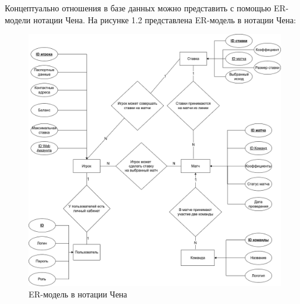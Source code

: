 Концептуально отношения в базе данных можно представить с помощью ER-модели нотации Чена.
На рисунке 1.2 представлена ER-модель в нотации Чена:
\FloatBarrier
\begin{figure}[hp]	
	\begin{center}
		\includegraphics[width=\linewidth]{inc/chen.png}
	\end{center}
	\caption{ER-модель в нотации Чена}
	\label{fig::chen}
\end{figure}
\FloatBarrier
